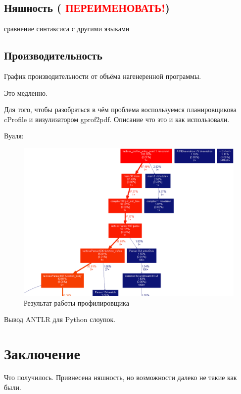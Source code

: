 \documentclass[12pt,a4paper,oneside]{extarticle}
\begin{document}
    \subsection{Няшность ( \textcolor{red}{ПЕРЕИМЕНОВАТЬ!})}

        сравнение синтаксиса с другими языками

    \subsection{Производительность}

        График производительности от объёма нагенеренной программы.

        Это медленно.

        Для того, чтобы разобраться в чём проблема воспользуемся планировщикова cProfile и визулизатором gprof2pdf. 
        Описание что это и как использовали.

        Вуаля:

        \begin{figure}[h!]
            \center
            \includegraphics[scale=0.3]{lactose_stats.png}
            \caption{Результат работы профилировщика}
            \label{pic:stats}
        \end{figure}

        Вывод ANTLR для Python слоупок.
    
\clearpage

\section{Заключение}
    Что получилось. Привнесена няшность, но возможности далеко не такие как были.
\clearpage
\end{document}
